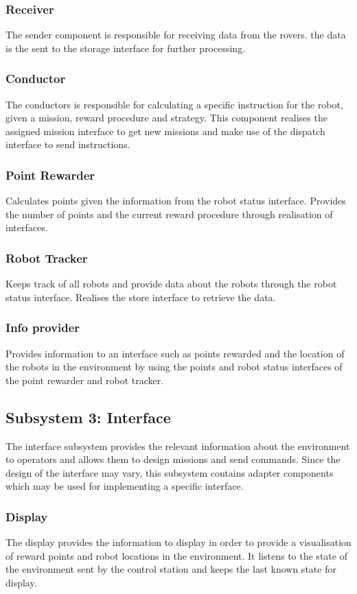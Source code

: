 \subsubsection*{Receiver}
The sender component is responsible for receiving data from the rovers. the data is the sent to the storage interface for further processing.
\subsubsection*{Conductor}
The conductors is responsible for calculating a specific instruction for the robot, given a mission, reward procedure and strategy. This component realises the assigned mission interface to get new missions and make use of the dispatch interface to send instructions.
\subsubsection*{Point Rewarder}
Calculates points given the information from the robot status interface. Provides the number of points and the current reward procedure through realisation of interfaces.
\subsubsection*{Robot Tracker}
Keeps track of all robots and provide data about the robots through the robot status interface. Realises the store interface to retrieve the data.
\subsubsection*{Info provider}
Provides information to an interface such as points rewarded and the location of the robots in the environment by using the points and robot status interfaces of the point rewarder and robot tracker.

\subsection*{Subsystem 3: Interface}
The interface subsystem provides the relevant information about the environment to operators and allows them to design missions and send commands. Since the design of the interface may vary, this subsystem contains adapter components which may be used for implementing a specific interface.
\subsubsection*{Display}
The display provides the information to display in order to provide a visualisation of reward points and robot locations in the environment. It listens to the state of the environment sent by the control station and keeps the last known state for display.
